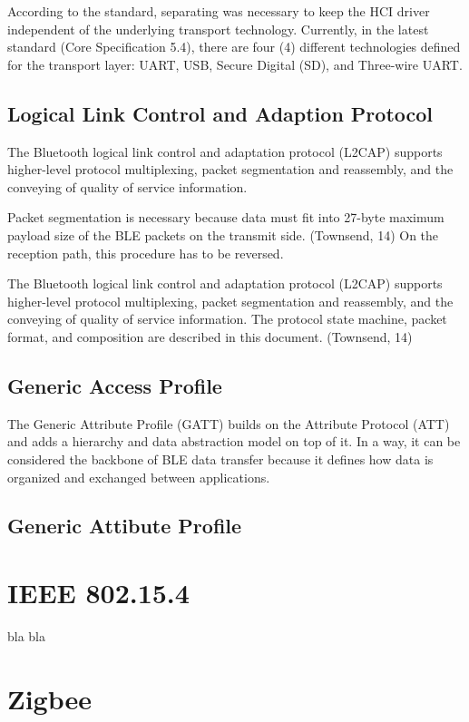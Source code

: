 According to the standard, separating was necessary to keep the HCI driver
independent of the underlying transport technology.
Currently, in the latest standard (Core Specification 5.4), there are four (4)
different technologies defined for the transport layer:
UART, USB, Secure Digital (SD), and Three-wire UART.

\subsection{Logical Link Control and Adaption Protocol}
The Bluetooth logical link control and adaptation protocol (L2CAP)
supports higher-level protocol multiplexing, packet segmentation and
reassembly, and the conveying of quality of service information. 

Packet segmentation is necessary because data must fit into 27-byte maximum
payload size of the BLE packets on the transmit side. (Townsend, 14)
On the reception path, this procedure has to be reversed.

The Bluetooth logical link control and adaptation protocol (L2CAP) supports
higher-level protocol multiplexing, packet segmentation and reassembly,
and the conveying of quality of service information.
The protocol state machine, packet format, and composition are described
in this document. (Townsend, 14)


\subsection{Generic Access Profile}
\label{ble:gap}
The Generic Attribute Profile (GATT) builds on the Attribute Protocol (ATT)
and adds a hierarchy and data abstraction model on top of it.
In a way, it can be considered the backbone of BLE data transfer because
it defines how data is organized and exchanged between applications.



\subsection{Generic Attibute Profile}
\label{ble:gatt}

\section{IEEE 802.15.4}
\label{sec:15_4}

bla bla

\section{Zigbee}
\label{sec:zig}

